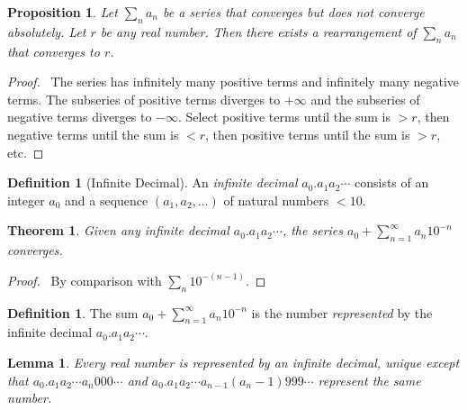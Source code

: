 \documentclass{article}
\let\qed\relax
\newtheorem{lemma}[axiom]{Lemma}
\newtheorem{proposition}[axiom]{Proposition}
\newtheorem{theorem}[axiom]{Theorem}
\theoremstyle{definition}
\newtheorem{definition}[axiom]{Definition}
\begin{document}
\begin{proposition}
    Let $\sum_n a_n$ be a series that converges but does not converge absolutely. Let $r$ be any real number. Then there exists a
    rearrangement of $\sum_n a_n$ that converges to $r$.
\end{proposition}

\begin{proof}
    \pf\ The series has infinitely many positive terms and infinitely many negative terms. The subseries of positive terms diverges to
    $+ \infty$ and the subseries of negative terms diverges to $- \infty$. Select positive terms until the sum is $>r$, then
    negative terms until the sum is $< r$, then positive terms until the sum is $> r$, etc. \qed
\end{proof}

\begin{definition}[Infinite Decimal]
    An \emph{infinite decimal} $a_0 . a_1 a_2 \cdots$ consists of an integer $a_0$ and a sequence $(a_1, a_2, \ldots)$ of natural numbers
    $< 10$.
\end{definition}

\begin{theorem}
    Given any infinite decimal $a_0 . a_1 a_2 \cdots$, the series $a_0 + \sum_{n=1}^\infty a_n 10^{-n}$ converges.
\end{theorem}

\begin{proof}
    \pf\ By comparison with $\sum_n 10^{-(n-1)}$. \qed
\end{proof}

\begin{definition}
    The sum $a_0 + \sum_{n=1}^\infty a_n 10^{-n}$ is the number \emph{represented} by the infinite decimal $a_0 . a_1 a_2 \cdots$.
\end{definition}

\begin{lemma}
    Every real number is represented by an infinite decimal, unique except that $a_0 . a_1 a_2 \cdots a_n 0 0 0 \cdots$ and
    $a_0 . a_1 a_2 \cdots a_{n-1} (a_n - 1) 9 9 9 \cdots$ represent the same number.
\end{lemma}
\end{document}
